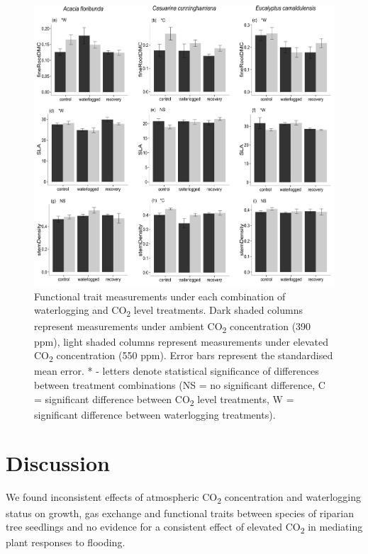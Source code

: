 \documentclass[12pt,a4paper]{memoir}
\begin{document}
\begin{figure}[h!]
\begin{center}
\includegraphics[width=\linewidth,keepaspectratio=true]{traits2.png} %
\caption[Functional trait measurements under each combination of waterlogging and CO\textsubscript{2} level treatments.]{\small{Functional trait measurements under each combination of waterlogging and CO\textsubscript{2} level treatments. Dark shaded columns represent measurements under ambient CO\textsubscript{2} concentration (390 ppm), light shaded columns represent measurements under elevated CO\textsubscript{2} concentration (550 ppm). Error bars represent the standardised mean error. * - letters denote statistical significance of differences between treatment combinations (NS = no significant difference, C = significant difference between CO\textsubscript{2} level treatments, W = significant difference between waterlogging treatments).}} %
\label{Ch5_F3} %
\end{center}
\end{figure}
\section{Discussion}
We found inconsistent effects of atmospheric CO\textsubscript{2} concentration and waterlogging status on growth, gas exchange and functional traits between species of riparian tree seedlings and no evidence for a consistent effect of elevated CO\textsubscript{2} in mediating plant responses to flooding. 
\end{document}
